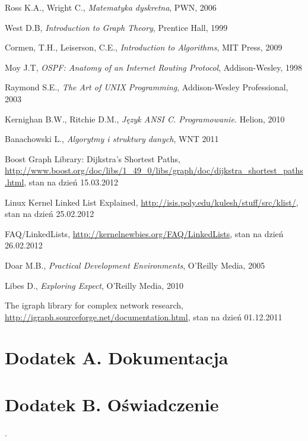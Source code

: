 \documentclass[a4paper,12pt,polish,oneside,openright]{thesis}
\begin{document}
\begin{thebibliography}{19}
Ross K.A., Wright C., \emph{Matematyka dyskretna}, PWN, 2006

West D.B, \emph{Introduction to Graph Theory}, Prentice Hall, 1999

Cormen, T.H., Leiserson, C.E., \emph{Introduction to Algorithms}, MIT Press, 2009

Moy J.T, \emph{OSPF: Anatomy of an Internet Routing Protocol}, Addison-Wesley, 1998

Raymond S.E., \emph{The Art of UNIX Programming}, Addison-Wesley Professional, 2003

Kernighan B.W., Ritchie D.M., \emph{Język ANSI C. Programowanie.} Helion, 2010

Banachowski L., \emph{Algorytmy i struktury danych}, WNT 2011

Boost Graph Library: Dijkstra's Shortest Paths, \url{http://www.boost.org/doc/libs/1_49_0/libs/graph/doc/dijkstra_shortest_paths.html}, stan na dzień 15.03.2012

Linux Kernel Linked List Explained, \url{http://isis.poly.edu/kulesh/stuff/src/klist/}, stan na dzień 25.02.2012

FAQ/LinkedLists, \url{http://kernelnewbies.org/FAQ/LinkedLists}, stan na dzień 26.02.2012

Doar M.B., \emph{Practical Development Environments}, O'Reilly Media, 2005

Libes D., \emph{Exploring Expect}, O'Reilly Media, 2010

The igraph library for complex network research, \url{http://igraph.sourceforge.net/documentation.html}, stan na dzień 01.12.2011

\end{thebibliography}



\chapter*{Dodatek A. Dokumentacja}
\chapter*{Dodatek B. Oświadczenie}

\newlength{\oldparskip}
\setlength{\oldparskip}{\parskip}
\setlength{\parindent}{0pt}.
\setlength{\parskip}{0.3cm}
\end{document}
